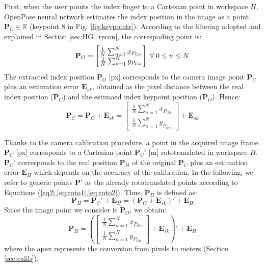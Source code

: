 \documentclass[a4paper, 10pt, conference]{ieeeconf}      %
\begin{document}
First, when the user points the index finger to a Cartesian point in workspace $H$, OpenPose neural network estimates the index position in the image as a point $\mathbf{P}_O \in \mathbb{R}$ (keypoint $8$ in Fig. \ref{fig:keypoints}). According to the filtering adopted and explained in Section \ref{sec:HG_recon}, the correspoding point is:
\begin{equation}
\mathbf{P}_O = \begin{bmatrix}
\frac{1}{N}\sum_{n=1}^{N}x_{P_{On}} \\
\frac{1}{N}\sum_{n=1}^{N}y_{P_{On}}
\end{bmatrix}
\thickspace \forall\thickspace 0 \leq n \leq N
\end{equation}
The extracted index position $\mathbf{P}_O$ [px] corresponds to the camera image point $\mathbf{P}_C$ plus an estimation error $\mathbf{E}_{sk}$, obtained as the pixel distance between the real index position ($\mathbf{P}_C$) and the estimaed index keypoint position ($\mathbf{P}_O$). Hence: 
\begin{equation}
\mathbf{P}_C = \mathbf{P}_O + \mathbf{E}_{sk} = \begin{bmatrix}
\frac{1}{N}\sum_{n=1}^{N}x_{P_{On}} \\
\frac{1}{N}\sum_{n=1}^{N}y_{P_{On}}
\end{bmatrix} + \mathbf{E}_{sk}
\end{equation}

Thanks to the camera calibration procedure, a point in the acquired image frame $\mathbf{P}_C$ [px] corresponds to a Cartesian point $\mathbf{P}_C'$ [m] rototranslated in workspace  $H$. $\mathbf{P}_C'$ corresponds to the real position $\mathbf{P}_H$ of the original $\mathbf{P}_C$ plus an estimation error $\mathbf{E}_H$ which depends on the accuracy of the calibration. In the following, we refer to generic points $\mathbf{P}'$ as the already rototranslated points according to Equations (\ref{eq2},\ref{eq:roto1},\ref{eq:roto2}). Thus, $\mathbf{P}_H$ is defined as:
\begin{equation}
\mathbf{P}_H = \mathbf{P}_C' + \mathbf{E}_H = (\mathbf{P}_O + \mathbf{E}_{sk})' + \mathbf{E}_H
\end{equation}
Since the image point we consider is $\mathbf{P}_O$, we obtain: 
\begin{equation}
\mathbf{P}_H = \left(\begin{bmatrix}
\frac{1}{N}\sum_{n=1}^{N}x_{P_{On}} \\
\frac{1}{N}\sum_{n=1}^{N}y_{P_{On}}
\end{bmatrix} + \mathbf{E}_{sk} \right)' + \mathbf{E}_H
\end{equation}
where the apex represents the conversion from pixels to meters (Section \ref{sec:calib}).
\end{document}
